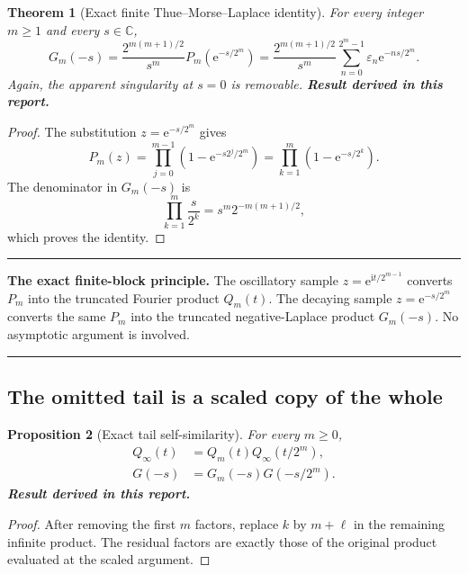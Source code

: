 \documentclass[11pt,oneside]{article}
\numberwithin{equation}{section}
\newtheorem{theorem}{Theorem}[section]
\newtheorem{proposition}[theorem]{Proposition}
\theoremstyle{definition}
\theoremstyle{remark}
\newcommand{\C}{\mathbb C}
\newcommand{\e}{\mathrm e}
\newcommand{\ii}{\mathrm i}
\newcommand{\eps}{\varepsilon}
\newcommand{\newresult}{\textbf{Result derived in this report.}}
\newenvironment{boxedremark}{%
  \par\smallskip\noindent\begin{center}\begin{minipage}{0.94\textwidth}%
  \color{black}\hrule\vspace{0.6em}\small
}{%
  \vspace{0.6em}\hrule\end{minipage}\end{center}\smallskip
}
\begin{document}
\begin{theorem}[Exact finite Thue--Morse--Laplace identity]
\label{p3:thm:finite-Laplace}
For every integer $m\ge1$ and every $s\in\C$,
\begin{equation}
 \boxed{
 G_m(-s)=\frac{2^{m(m+1)/2}}{s^m}
 P_m\!\left(\e^{-s/2^m}\right)
 =\frac{2^{m(m+1)/2}}{s^m}
  \sum_{n=0}^{2^m-1}\eps_n\e^{-ns/2^m}.}
 \label{p3:eq:finite-Laplace}
\end{equation}
Again, the apparent singularity at $s=0$ is removable.
\newresult
\end{theorem}

\begin{proof}
The substitution $z=\e^{-s/2^m}$ gives
\[
 P_m(z)=\prod_{j=0}^{m-1}\left(1-\e^{-s2^j/2^m}\right)
       =\prod_{k=1}^{m}\left(1-\e^{-s/2^k}\right).
\]
The denominator in $G_m(-s)$ is
\[
 \prod_{k=1}^{m}\frac{s}{2^k}
 =s^m2^{-m(m+1)/2},
\]
which proves the identity.
\end{proof}

\begin{boxedremark}
\textbf{The exact finite-block principle.}
The oscillatory sample $z=\e^{\ii t/2^{m-1}}$ converts $P_m$ into the truncated Fourier
product $Q_m(t)$.  The decaying sample $z=\e^{-s/2^m}$ converts the same $P_m$ into the
truncated negative-Laplace product $G_m(-s)$.  No asymptotic argument is involved.
\end{boxedremark}

\subsection{The omitted tail is a scaled copy of the whole}

\begin{proposition}[Exact tail self-similarity]
\label{p3:prop:tail-self}
For every $m\ge0$,
\begin{align}
 Q_\infty(t)&=Q_m(t)Q_\infty(t/2^m),
 \label{p3:eq:Q-tail-self}\\
 G(-s)&=G_m(-s)G(-s/2^m).
 \label{p3:eq:G-tail-self}
\end{align}
\newresult
\end{proposition}

\begin{proof}
After removing the first $m$ factors, replace $k$ by $m+\ell$ in the remaining infinite
product.  The residual factors are exactly those of the original product evaluated at the
scaled argument.
\end{proof}
\end{document}
